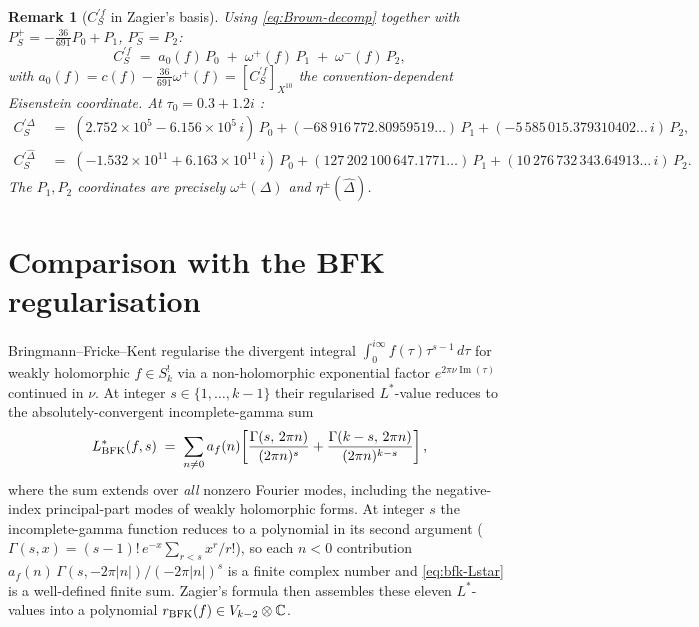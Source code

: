 \documentclass[11pt,letterpaper]{article}
\newtheorem{remark}[theorem]{Remark}
\newcommand{\CC}{\mathbb{C}}
\newcommand{\Dhat}{\widehat{\Delta}}
\DeclareMathOperator{\im}{Im}
\begin{document}
\begin{remark}[$C^{\prime f}_S$ in Zagier's basis]\label{rem:Zagier-decomp}
Using \eqref{eq:Brown-decomp} together with $P^+_S = -\tfrac{36}{691}P_0 + P_1$,
$P^-_S = P_2$:
\[
  C^{\prime f}_S \;=\; a_0(f)\,P_0 \;+\; \omega^+(f)\,P_1 \;+\; \omega^-(f)\,P_2,
\]
with $a_0(f) = c(f) - \tfrac{36}{691}\omega^+(f) = [C^{\prime f}_S]_{X^{10}}$
the convention-dependent Eisenstein coordinate.  At
$\tau_0 = 0.3 + 1.2i$ \cite{NumericScript}:
\begin{align*}
  C^{\prime \Delta}_S
   &\;=\; (2.752\!\times\!10^5 - 6.156\!\times\!10^5\,i)\,P_0
       + (-68\,916\,772.80959519\ldots)\,P_1
       + (-5\,585\,015.379310402\ldots\,i)\,P_2,\\
  C^{\prime \Dhat}_S
   &\;=\; (-1.532\!\times\!10^{11} + 6.163\!\times\!10^{11}\,i)\,P_0
       + (127\,202\,100\,647.1771\ldots)\,P_1
       + (10\,276\,732\,343.64913\ldots\,i)\,P_2.
\end{align*}
The $P_1, P_2$ coordinates are precisely $\omega^\pm(\Delta)$ and
$\eta^\pm(\Dhat)$.
\end{remark}

\section{Comparison with the BFK regularisation}\label{sec:bfk}

Bringmann--Fricke--Kent \cite{BFK2011} regularise the divergent integral
$\int_0^{i\infty}\!f(\tau)\tau^{s-1}\,d\tau$ for weakly holomorphic
$f \in S_k^!$ via a non-holomorphic exponential factor
$e^{2\pi\nu\im(\tau)}$ continued in $\nu$.  At integer
$s \in \{1, \ldots, k-1\}$ their regularised $L^*$-value reduces to the
absolutely-convergent incomplete-gamma sum
\begin{equation}\label{eq:bfk-Lstar}
  L^*_{\rm BFK}(f, s)
  \;=\;
  \sum_{n \ne 0} a_f(n)\!\left[\frac{\Gamma(s,\,2\pi n)}{(2\pi n)^s}
  + \frac{\Gamma(k-s,\,2\pi n)}{(2\pi n)^{k-s}}\right],
\end{equation}
where the sum extends over \emph{all} nonzero Fourier modes, including
the negative-index principal-part modes of weakly holomorphic forms.
At integer $s$ the incomplete-gamma function reduces to a polynomial in
its second argument
($\Gamma(s, x) = (s-1)!\,e^{-x}\sum_{r < s} x^r/r!$), so each $n < 0$
contribution
$a_f(n)\,\Gamma(s, -2\pi|n|)/(-2\pi|n|)^s$
is a finite complex number and \eqref{eq:bfk-Lstar} is a well-defined
finite sum.  Zagier's formula then assembles these eleven $L^*$-values
into a polynomial $r_{\rm BFK}(f) \in V_{k-2}\otimes\CC$.
\end{document}
